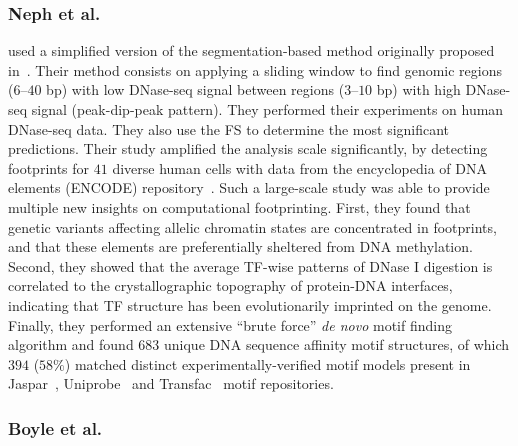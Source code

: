 \subsubsection{Neph et al.}

\cite{neph2012a} used a simplified version of the segmentation-based method originally proposed in~\cite{hesselberth2009}. Their method consists on applying a sliding window to find genomic regions ($6$--$40$ bp) with low DNase-seq signal between regions ($3$--$10$ bp) with high DNase-seq signal (peak-dip-peak pattern). They performed their experiments on human DNase-seq data. They also use the FS to determine the most significant predictions. Their study amplified the analysis scale significantly, by detecting footprints for $41$ diverse human cells with data from the encyclopedia of DNA elements (ENCODE) repository~\citep{encode2012}. Such a large-scale study was able to provide multiple new insights on computational footprinting. First, they found that genetic variants affecting allelic chromatin states are concentrated in footprints, and that these elements are preferentially sheltered from DNA methylation. Second, they showed that the average TF-wise patterns of DNase I digestion is correlated to the crystallographic topography of protein-DNA interfaces, indicating that TF structure has been evolutionarily imprinted on the genome. Finally, they performed an extensive ``brute force'' \emph{de novo} motif finding algorithm and found $683$ unique DNA sequence affinity motif structures, of which $394$ ($58\%$) matched distinct experimentally-verified motif models present in Jaspar~\citep{mathelier2014}, Uniprobe~\citep{robasky2011} and Transfac~\citep{matys2006} motif repositories.

\subsubsection{Boyle et al.}

